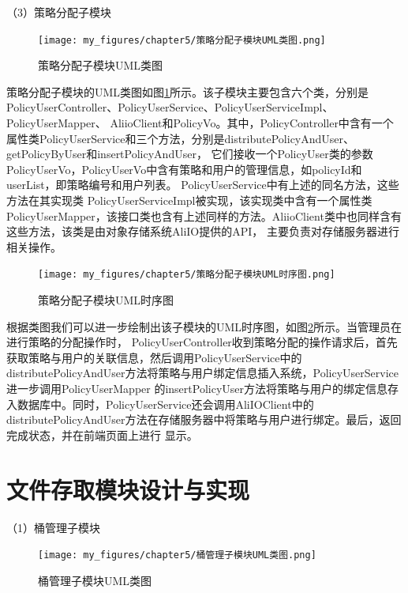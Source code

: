 （3）策略分配子模块


\begin{figure}[htb]
    \centering
    \texttt{[image: my\_figures/chapter5/策略分配子模块UML类图.png]}
    \caption{策略分配子模块UML类图}
    \label{fig:策略分配子模块UML类图}
\end{figure}

策略分配子模块的UML类图如图\ref{fig:策略分配子模块UML类图}所示。该子模块主要包含六个类，分别是PolicyUserController、PolicyUserService、PolicyUserServiceImpl、
PolicyUserMapper、 
AliioClient和PolicyVo。其中，PolicyController中含有一个属性类PolicyUserService和三个方法，分别是distributePolicyAndUser、getPolicyByUser和insertPolicyAndUser，
它们接收一个PolicyUser类的参数PolicyUserVo，PolicyUserVo中含有策略和用户的管理信息，如policyId和userList，即策略编号和用户列表。
PolicyUserService中有上述的同名方法，这些方法在其实现类
PolicyUserServiceImpl被实现，该实现类中含有一个属性类PolicyUserMapper，该接口类也含有上述同样的方法。AliioClient类中也同样含有这些方法，该类是由对象存储系统AliIO提供的API，
主要负责对存储服务器进行相关操作。

\begin{figure}[htb]
    \centering
    \texttt{[image: my\_figures/chapter5/策略分配子模块UML时序图.png]}
    \caption{策略分配子模块UML时序图}
    \label{fig:策略分配子模块UML时序图}
\end{figure}

根据类图我们可以进一步绘制出该子模块的UML时序图，如图\ref{fig:策略分配子模块UML时序图}所示。当管理员在进行策略的分配操作时，
PolicyUserController收到策略分配的操作请求后，首先获取策略与用户的关联信息，然后调用PolicyUserService中的distributePolicyAndUser方法将策略与用户绑定信息插入系统，PolicyUserService进一步调用PolicyUserMapper
的insertPolicyUser方法将策略与用户的绑定信息存入数据库中。同时，PolicyUserService还会调用AliIOClient中的distributePolicyAndUser方法在存储服务器中将策略与用户进行绑定。最后，返回完成状态，并在前端页面上进行
显示。




\section{文件存取模块设计与实现}

（1）桶管理子模块

\begin{figure}[htb]
    \centering
    \texttt{[image: my\_figures/chapter5/桶管理子模块UML类图.png]}
    \caption{桶管理子模块UML类图}
    \label{fig:桶管理子模块UML类图}
\end{figure}


